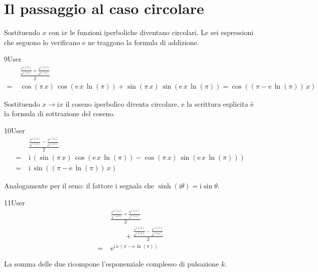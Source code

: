 \section{Il passaggio al caso circolare}

Sostituendo $x$ con $\mathrm{i}x$ le funzioni iperboliche diventano circolari. Le sei espressioni che seguono lo verificano e ne traggono la formula di addizione.

\begin{espr}{9}{User}{}
\begin{align*}
& \frac{\frac{\mathrm{e}^{\pi\, \left(\mathrm{i}\, x\right)}}{\pi^{\mathrm{e}\, \left(\mathrm{i}\, x\right)}} + \frac{\pi^{\mathrm{e}\, \left(\mathrm{i}\, x\right)}}{\mathrm{e}^{\pi\, \left(\mathrm{i}\, x\right)}}}{2} \\
=\;& \cos\!\left(\pi\, x\right)\, \cos\!\left(\mathrm{e}\, x\, \ln\!\left(\pi\right)\right) + \sin\!\left(\pi\, x\right)\, \sin\!\left(\mathrm{e}\, x\, \ln\!\left(\pi\right)\right) = \cos\!\left(\left(\pi - \mathrm{e}\, \ln\!\left(\pi\right)\right)\, x\right)
\end{align*}
\end{espr}
Sostituendo $x\to\mathrm{i}x$ il coseno iperbolico diventa circolare, e la scrittura esplicita è la formula di sottrazione del coseno.

\begin{espr}{10}{User}{\verificata}
\begin{align*}
& \frac{\frac{\mathrm{e}^{\pi\, \left(\mathrm{i}\, x\right)}}{\pi^{\mathrm{e}\, \left(\mathrm{i}\, x\right)}} - \frac{\pi^{\mathrm{e}\, \left(\mathrm{i}\, x\right)}}{\mathrm{e}^{\pi\, \left(\mathrm{i}\, x\right)}}}{2} \\
=\;& \mathrm{i}\, \left(\sin\!\left(\pi\, x\right)\, \cos\!\left(\mathrm{e}\, x\, \ln\!\left(\pi\right)\right) - \cos\!\left(\pi\, x\right)\, \sin\!\left(\mathrm{e}\, x\, \ln\!\left(\pi\right)\right)\right) \\
=\;& \mathrm{i}\, \sin\!\left(\left(\pi - \mathrm{e}\, \ln\!\left(\pi\right)\right)\, x\right)
\end{align*}
\end{espr}
Analogamente per il seno: il fattore $\mathrm{i}$ segnala che $\sinh(\mathrm{i}\theta)=\mathrm{i}\sin\theta$.

\begin{espr}{11}{User}{\verificata}
\begin{align*}
& \frac{\frac{\mathrm{e}^{\pi\, \left(\mathrm{i}\, x\right)}}{\pi^{\mathrm{e}\, \left(\mathrm{i}\, x\right)}} + \frac{\pi^{\mathrm{e}\, \left(\mathrm{i}\, x\right)}}{\mathrm{e}^{\pi\, \left(\mathrm{i}\, x\right)}}}{2} \\
&\qquad + \frac{\frac{\mathrm{e}^{\pi\, \left(\mathrm{i}\, x\right)}}{\pi^{\mathrm{e}\, \left(\mathrm{i}\, x\right)}} - \frac{\pi^{\mathrm{e}\, \left(\mathrm{i}\, x\right)}}{\mathrm{e}^{\pi\, \left(\mathrm{i}\, x\right)}}}{2} \\
=\;& \mathrm{e}^{\mathrm{i}\, x\, \left(\pi - \mathrm{e}\, \ln\!\left(\pi\right)\right)}
\end{align*}
\end{espr}
La somma delle due ricompone l'esponenziale complesso di pulsazione $k$.

